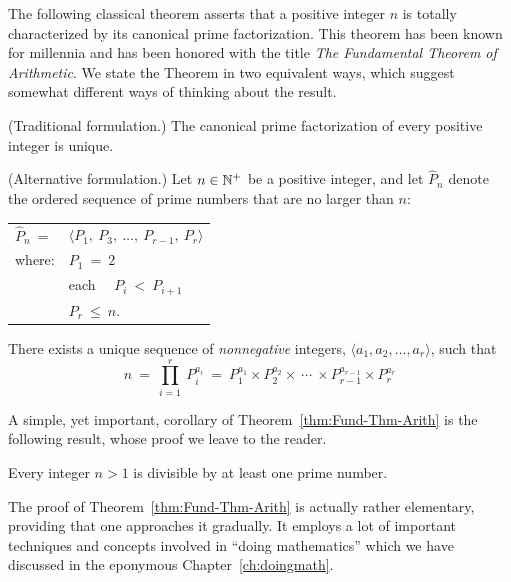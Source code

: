 \medskip

The following classical theorem asserts that a positive integer $n$ is totally characterized by its canonical prime factorization.  This theorem has been known for millennia and has been honored with the title {\em The Fundamental Theorem of Arithmetic}.  We state the Theorem in two equivalent ways, which suggest somewhat different ways of thinking about the result.

\begin{theorem}
\label{thm:Fund-Thm-Arith}

\noindent
{\rm (Traditional formulation.)}
%
The canonical prime factorization of every positive integer is unique.

\medskip

\noindent
{\rm (Alternative formulation.)}
%
Let $n \in \mathbb{N}^+$ be a positive integer, and let $\widehat{P}_n$ denote the ordered sequence of prime numbers that are no larger than $n$:

\smallskip

\begin{tabular}{ll}
$\widehat{P}_n \ =$  & $\langle P_1, \ P_3, \ \ldots, \ P_{r-1}, \ P_r \rangle$ \\
where:               & $P_1 \ = \ 2$ \\
                          & each  \ \ $P_i \ < \ P_{i+1}$ \\
                          & $P_r \ \leq \ n$.
\end{tabular}

\smallskip

\noindent
There exists a unique sequence of {\em nonnegative} integers, $\langle a_1, a_2, \ldots, a_r \rangle$, such that
\[
n \ = \ \prod_{i=1}^r \ P_i^{a_i} \ = \
P_1^{a_1} \times P_2^{a_2} \times \ \cdots \ \times P_{r-1}^{a_{r-1}} \times P_r^{a_r}
\]
\end{theorem}

A simple, yet important, corollary of Theorem~\ref{thm:Fund-Thm-Arith} is the following result, whose proof we leave to the reader.

\begin{prop}
\label{thm:prime-divisor}
Every integer $n>1$ is divisible by at least one prime number.
\end{prop}

\bigskip

The proof of Theorem~\ref{thm:Fund-Thm-Arith} is actually rather elementary, providing that one approaches it gradually.  It employs a lot of important techniques and concepts involved in ``doing
mathematics'' which we have discussed in the eponymous Chapter~\ref{ch:doingmath}.

